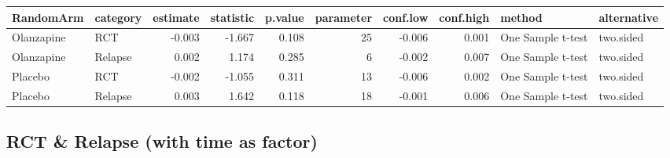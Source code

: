 \documentclass[]{article}
\newenvironment{Shaded}{\begin{snugshade}}{\end{snugshade}}
\newcommand{\KeywordTok}[1]{\textcolor[rgb]{0.13,0.29,0.53}{\textbf{#1}}}
\newcommand{\DataTypeTok}[1]{\textcolor[rgb]{0.13,0.29,0.53}{#1}}
\newcommand{\DecValTok}[1]{\textcolor[rgb]{0.00,0.00,0.81}{#1}}
\newcommand{\StringTok}[1]{\textcolor[rgb]{0.31,0.60,0.02}{#1}}
\newcommand{\OperatorTok}[1]{\textcolor[rgb]{0.81,0.36,0.00}{\textbf{#1}}}
\newcommand{\NormalTok}[1]{#1}
\theoremstyle{definition}
\theoremstyle{definition}
\theoremstyle{definition}
\theoremstyle{remark}
\begin{document}
\begin{Shaded}
\end{Shaded}

\begin{tabular}{l|l|r|r|r|r|r|r|l|l}
\hline
RandomArm & category & estimate & statistic & p.value & parameter & conf.low & conf.high & method & alternative\\
\hline
Olanzapine & RCT & -0.003 & -1.667 & 0.108 & 25 & -0.006 & 0.001 & One Sample t-test & two.sided\\
\hline
Olanzapine & Relapse & 0.002 & 1.174 & 0.285 & 6 & -0.002 & 0.007 & One Sample t-test & two.sided\\
\hline
Placebo & RCT & -0.002 & -1.055 & 0.311 & 13 & -0.006 & 0.002 & One Sample t-test & two.sided\\
\hline
Placebo & Relapse & 0.003 & 1.642 & 0.118 & 18 & -0.001 & 0.006 & One Sample t-test & two.sided\\
\hline
\end{tabular}

\subsection{RCT \& Relapse (with time as
factor)}\label{rct-relapse-with-time-as-factor-2}
\end{document}
